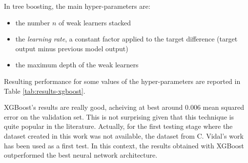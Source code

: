 In tree boosting, the main hyper-parameters are:
\begin{itemize}
    \item the number $n$ of weak learners stacked
    \item the \textit{learning rate}, a constant factor applied to the target difference (target output minus previous model output)
    \item the maximum depth of the weak learners
\end{itemize}

Resulting performance for some values of the hyper-parameters are reported in Table \ref{tab:results-xgboost}.

XGBoost's results are really good, acheiving at best around 0.006 mean squared error on the validation set. This is not surprising given that this technique is quite popular in the literature. Actually, for the first testing stage where the dataset created in this work was not available, the dataset from C. Vidal's work has been used as a first test. In this context, the results obtained with XGBoost outperformed the best neural network architecture.

